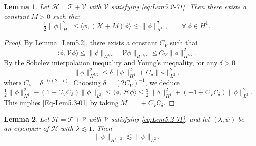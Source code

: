 \documentclass{sn-jnl}%
\numberwithin{equation}{section}
\theoremstyle{thmstyleone}%
\newtheorem{lemma}{Lemma}[section]%
\theoremstyle{thmstyletwo}%
\theoremstyle{thmstylethree}%
\begin{document}
\begin{lemma}\label{Lem5.3}
 Let $\mathcal{H}=\mathcal{T}+\mathcal{V}$ with $\mathcal{V}$ satisfying \eqref{eq:Lem5.2-01}. Then there exists a constant $M>0$ such that
\begin{equation}\label{Eq-Lem5.3-01}
\tfrac12\|\phi\|_{H^1}^2 \leq \langle \phi, (\mathcal{H}+M)\phi\rangle \lesssim \|\phi\|_{H^1}^2,\qquad \forall\, \phi \in H^1.
\end{equation}
\end{lemma}

\begin{proof}
By Lemma~\ref{Lem5.2}, there exists a constant $C_V$ such that
\begin{equation}
\langle \phi, \mathcal{V}\phi \rangle 
\leq \|\phi\|_{H^{l/2}} \|\mathcal{V}\phi\|_{H^{-l/2}} 
\leq C_V \|\phi\|_{H^{l/2}}^2.
\end{equation}
By the Sobolev interpolation inequality and Young's inequality, for any $\delta>0$,
\[
\|\phi\|_{H^{l/2}}^2 
\leq \delta \|\phi\|_{H^1}^2 + C_\delta \|\phi\|_{L^2}^2,
\]
where $C_\delta = \delta^{-l/(2-l)}$.
Choosing $\delta = (2C_V)^{-1}$, we deduce
\[
 \tfrac{1}{2}\|\phi\|_{H^1}^2 - (1 + C_V C_\delta)\|\phi\|_{L^2}^2
 \leq \langle \phi, \mathcal{H}\phi \rangle 
 \leq\tfrac{3}{2}\|\phi\|_{H^1}^2 + (-1 + C_V C_\delta)\|\phi\|_{L^2}^2.
\]
This implies \eqref{Eq-Lem5.3-01} by taking $M = 1 + C_V C_\delta$. 
\end{proof}     

\begin{lemma}\label{Lem5.4}
Let $\mathcal{H}=\mathcal{T}+\mathcal{V}$ with $\mathcal{V}$ satisfying \eqref{eq:Lem5.2-01}, and let $(\lambda,\psi)$ be an eigenpair of $\mathcal{H}$ with $\lambda\lesssim 1$. Then 
    \begin{equation}\label{Eq-Lem5.4-01}
    \|\psi\|_{H^{s+2}} \lesssim \|\psi\|_{L^2}.
    \end{equation}
\end{lemma}
\end{document}
